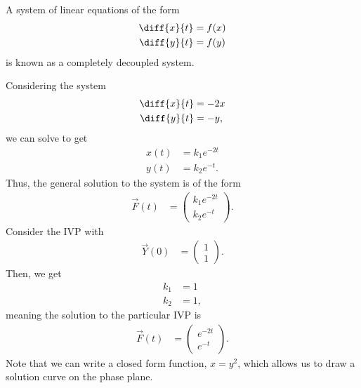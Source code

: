 \documentclass[10pt]{mypackage}
\begin{document}
\begin{definition}
  A system of linear equations of the form
  \begin{align*}
    \diff{x}{t} &= f(x)\\
    \diff{y}{t} &= f(y)
  \end{align*}
   is known as a completely decoupled system.
\end{definition}
\begin{example}
  Considering the system
  \begin{align*}
    \diff{x}{t} &= -2x\\
    \diff{y}{t} &= -y,
  \end{align*}
  we can solve to get
  \begin{align*}
    x(t) &= k_1e^{-2t}\\
    y(t) &= k_2e^{-t}.
  \end{align*}
  Thus, the general solution to the system is of the form
  \begin{align*}
    \vec{F}(t) &= \begin{pmatrix}k_1e^{-2t}\\k_2e^{-t}\end{pmatrix}.
  \end{align*}
  Consider the IVP with 
  \begin{align*}
    \vec{Y}(0) &= \begin{pmatrix}1\\1\end{pmatrix}.
  \end{align*}
  Then, we get
  \begin{align*}
    k_1 &= 1\\
    k_2 &= 1,
  \end{align*}
  meaning the solution to the particular IVP is
  \begin{align*}
    \vec{F}(t) &= \begin{pmatrix}e^{-2t}\\e^{-t}\end{pmatrix}.
  \end{align*}
  Note that we can write a closed form function, $x = y^2$, which allows us to draw a solution curve on the phase plane.
\end{example}
\end{document}
